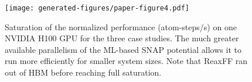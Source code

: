 \documentclass[anonymous,sigconf,9pt]{acmart}
\begin{document}
\begin{figure}[tbp]
\if{}
\else
\texttt{[image: generated-figures/paper-figure4.pdf]}
\fi
\caption{Saturation of the normalized performance (atom-steps/s) on one NVIDIA H100 GPU for the three case studies. The much greater available parallelism of the ML-based SNAP potential allows it to run more efficiently for smaller system sizes. Note that ReaxFF ran out of HBM before reaching full saturation.}\label{fig:perfsat}
\end{figure}
\end{document}

